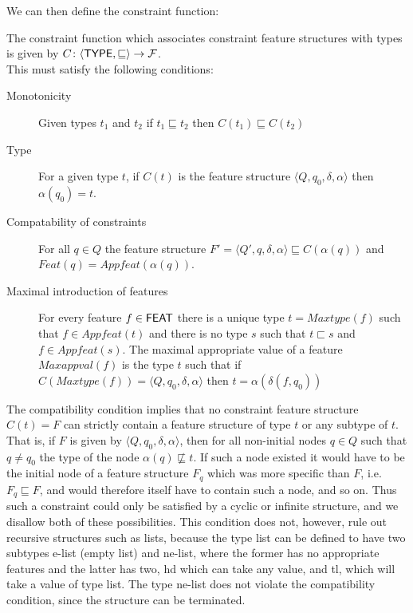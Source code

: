 \documentclass[12pt]{report}
\begin{document}
We can then define the constraint function:
\begin{definition} The constraint function which
associates
constraint feature structures with types is given by
$C\colon \langle {\sf TYPE},\sqsubseteq\rangle\to {\cal F}$.\\
This must satisfy the following conditions:
\begin{description}
\item[Monotonicity] Given types  $t_{1}$ and $t_{2}$  if
$t_{1} \sqsubseteq t_{2}$ then $C(t_{1}) \sqsubseteq C(t_{2})$
\item[Type] For a given type $t$, if $C(t)$ is the feature structure
$\langle Q,q_{0},\delta,\alpha\rangle$ then 
$\alpha({q_{0}})=t$.
\item[Compatability of constraints] 
For all $q \in Q$ the feature structure
$F'= \langle Q',q,\delta,\alpha\rangle 
\sqsubseteq C(\alpha(q))$ and $Feat(q) = Appfeat(\alpha(q))$.

\item[Maximal introduction of features] 
For every feature $f \in {\sf FEAT}$
there is a unique type $t = Maxtype(f)$ such that 
$f \in Appfeat(t)$ 
and there is no type $s$ such that  $t \sqsubset s$
and $f \in Appfeat(s)$.
The maximal appropriate value of a feature $Maxappval(f)$ is the type $t$
such that if $C(Maxtype(f))= \langle Q,q_{0},\delta,\alpha\rangle$ then 
$t=\alpha (\delta (f, {q_{0}})) $
\end{description}
\end{definition}

The compatibility condition implies that no constraint feature
structure $C(t)=F$ can strictly contain a feature structure of type $t$
or any subtype of $t$.  That is, if $F$ is given by 
$\langle Q,q_{0},\delta,\alpha\rangle$, then for all non-initial nodes
$q\in Q$ such that $q \neq {q_{0}} $ the type of the node $\alpha(q) \not\sqsubseteq t$.
If such a node existed it would have to be the initial node of a
feature structure $F_q$ which was more specific than $F$, 
i.e.~$F_q \sqsubseteq F$, and would therefore itself have to contain such
a node, and so on.  Thus such a constraint could only be satisfied by
a cyclic or infinite structure, and we disallow both of these possibilities.
This condition does not, however, rule out recursive structures such
as lists, because the type {\type list} can be defined to have two
subtypes {\type e-list} (empty list) and {\type ne-list}, where the former
has no appropriate features and the latter has two, {\feature hd} which
can take any value, and {\feature tl}, which will take a value of type
{\type list}.  The type {\type ne-list} does not violate the
compatibility condition, since the structure can be terminated.
\end{document}
